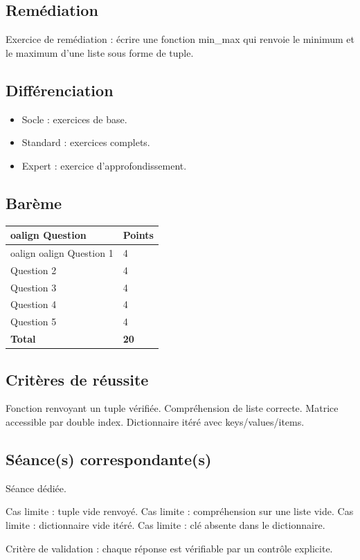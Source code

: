 \subsection{Remédiation}

Exercice de remédiation : écrire une fonction min\_max qui renvoie le
minimum et le maximum d'une liste sous forme de tuple.

\subsection{Différenciation}

\begin{itemize}
\tightlist
\item
  Socle : exercices de base.
\item
  Standard : exercices complets.
\item
  Expert : exercice d'approfondissement.
\end{itemize}

\subsection{Barème}

\begin{longtable}[]{@{}ll@{}}
\toprule
oalign{}
Question & Points \\
\midrule
oalign{}
\endhead
\bottomrule
oalign{}
\endlastfoot
Question 1 & 4 \\
Question 2 & 4 \\
Question 3 & 4 \\
Question 4 & 4 \\
Question 5 & 4 \\
\textbf{Total} & \textbf{20} \\
\end{longtable}

\subsection{Critères de réussite}

Fonction renvoyant un tuple vérifiée. Compréhension de liste correcte.
Matrice accessible par double index. Dictionnaire itéré avec
keys/values/items.

\subsection{Séance(s) correspondante(s)}

Séance dédiée.

Cas limite : tuple vide renvoyé. Cas limite : compréhension sur une
liste vide. Cas limite : dictionnaire vide itéré. Cas limite : clé
absente dans le dictionnaire.

Critère de validation : chaque réponse est vérifiable par un contrôle
explicite.
